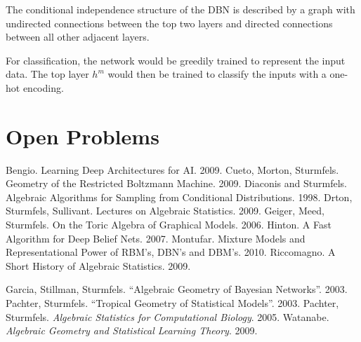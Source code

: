 \documentclass[11pt,titlepage]{article}
\begin{document}
    The conditional independence structure of the DBN is described by a graph
    with undirected connections between the top two layers and directed
    connections between all other adjacent layers.
    \begin{center}
    \end{center}
    For classification, the network would be greedily trained to represent the
    input data.  The top layer $h^m$ would then be trained to classify the
    inputs with a one-hot encoding.

\section{Open Problems}
\begin{thebibliography}{100}
     Bengio.  Learning Deep Architectures for AI. 2009.
     Cueto, Morton, Sturmfels. Geometry of the Restricted
    Boltzmann Machine.  2009.
     Diaconis and Sturmfels.  Algebraic Algorithms for Sampling
    from Conditional Distributions. 1998.
     Drton, Sturmfels, Sullivant. Lectures on Algebraic
    Statistics. 2009.
     Geiger, Meed, Sturmfels.  On the Toric Algebra of Graphical
    Models. 2006.
     Hinton.  A Fast Algorithm for Deep Belief Nets.  2007.
     Montufar.  Mixture Models and Representational Power of
    RBM's, DBN's and DBM's.  2010.
     Riccomagno.  A Short History of Algebraic
    Statistics.  2009.

     Garcia, Stillman, Sturmfels.  ``Algebraic Geometry of Bayesian
    Networks''.  2003.
     Pachter, Sturmfels.  ``Tropical Geometry of Statistical
    Models''. 2003.
     Pachter, Sturmfels.  \textit{Algebraic Statistics for
    Computational Biology}.  2005.
     Watanabe.  \textit{Algebraic Geometry and Statistical Learning
    Theory}.  2009.
\end{thebibliography}
\end{document}
